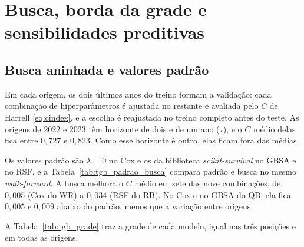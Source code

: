 
\section{Busca, borda da grade e sensibilidades preditivas}
\label{sec:busca_aninhada}

\subsection{Busca aninhada e valores padrão}
\label{subsec:apend_busca}

Em cada origem, os dois últimos anos do treino formam a validação: cada combinação de hiperparâmetros é ajustada no restante e avaliada pelo $C$ de Harrell \eqref{eq:cindex}, e a escolha é reajustada no treino completo antes do teste. As origens de 2022 e 2023 têm horizonte de dois e de um ano ($\tau$), e o $C$ médio delas fica entre $0{,}727$ e $0{,}823$. Como esse horizonte é outro, elas ficam fora das médias.

Os valores padrão são $\lambda = 0$ no Cox e os da biblioteca \textit{scikit-survival} no GBSA e no RSF, e a Tabela~\ref{tab:tgb_padrao_busca} compara padrão e busca no mesmo \textit{walk-forward}. A busca melhora o $C$ médio em sete das nove combinações, de $0{,}005$ (Cox do WR) a $0{,}034$ (RSF do RB). No Cox e no GBSA do QB, ela fica $0{,}005$ e $0{,}009$ abaixo do padrão, menos que a variação entre origens.

A Tabela~\ref{tab:tgb_grade} traz a grade de cada modelo, igual nas três posições e em todas as origens.

